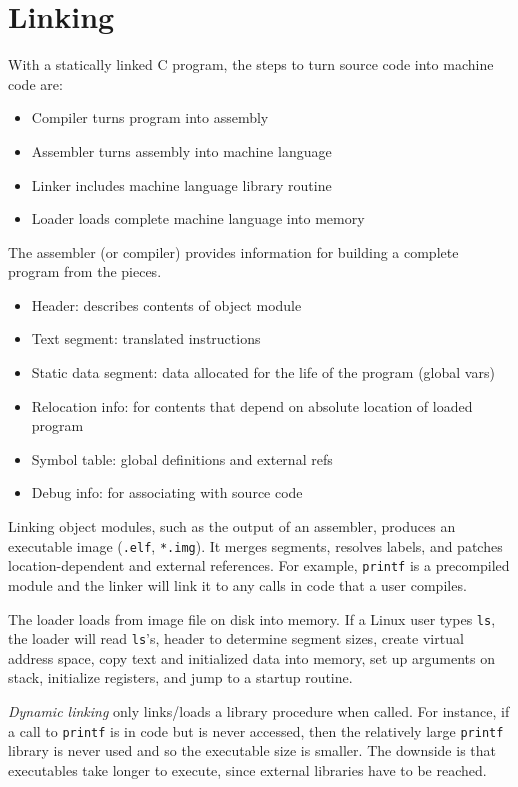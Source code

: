 \section{Linking}

With a statically linked C program,
the steps to turn source code into
machine code are:
\begin{itemize}
    \item Compiler turns program into assembly
    \item Assembler turns assembly into machine language
    \item Linker includes machine language library routine
    \item Loader loads complete machine language into memory
\end{itemize}

The assembler (or compiler) provides information
for building a complete program from the pieces.
\begin{itemize}
    \item Header: describes contents of object module
    \item Text segment: translated instructions
    \item Static data segment: data allocated for the life of the program (global vars)
    \item Relocation info: for contents that depend on absolute location of loaded program
    \item Symbol table: global definitions and external refs
    \item Debug info: for associating with source code
\end{itemize}

Linking object modules, such as the output of an
assembler, produces an executable image (\texttt{.elf},
\texttt{*.img}). It merges segments, resolves labels, and
patches location-dependent and external references.
For example, \texttt{printf} is a precompiled module and
the linker will link it to any calls in code that a
user compiles.

The loader loads from image file on disk into memory. If a
Linux user types \texttt{ls}, the loader will read \texttt{ls}'s,
header to determine segment sizes, create virtual address space,
copy text and initialized data into memory, set up arguments
on stack, initialize registers, and jump to a startup routine.

\emph{Dynamic linking} only links/loads a library procedure when
called. For instance, if a call to \texttt{printf} is in code
but is never accessed, then the relatively large \texttt{printf}
library is never used and so the executable size is smaller. The
downside is that executables take longer to execute, since
external libraries have to be reached.


